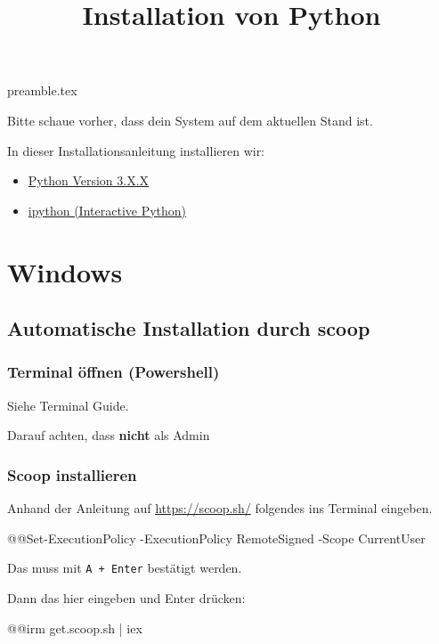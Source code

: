 \RequirePackage{import}
{preamble.tex}
\usepackage{hyperref}
\title{Installation von Python}


\maketitle

Bitte schaue vorher, dass dein System auf dem aktuellen Stand ist.

In dieser Installationsanleitung installieren wir:
\begin{itemize}
    \item \href{https://www.python.org/}{Python Version 3.X.X}
    \item \href{https://ipython.org/}{ipython (\underline{I}nteractive \underline{P}ython)}
\end{itemize}

\section*{Windows}
\subsection*{Automatische Installation durch scoop}

\subsubsection*{Terminal öffnen (Powershell)}
Siehe Terminal Guide.

Darauf achten, dass \textbf{nicht} als Admin

\subsubsection*{Scoop installieren}
Anhand der Anleitung auf \url{https://scoop.sh/} folgendes ins Terminal eingeben.
\begin{commandshell}
@\shellprefix{}@Set-ExecutionPolicy -ExecutionPolicy RemoteSigned -Scope CurrentUser
\end{commandshell}
Das muss mit \verb#A + Enter# bestätigt werden.

Dann das hier eingeben und Enter drücken:
\begin{commandshell}
@\shellprefix{}@irm get.scoop.sh | iex
\end{commandshell}


